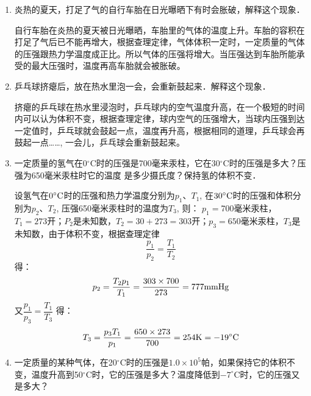 \begin{enumerate}
	\item 炎热的夏天，打足了气的自行车胎在日光曝晒下有时会胀破，解释这个现象．

\begin{solution}
  自行车胎在炎热的夏天被日光曝晒，车胎里的气体的温度上升。车胎的容积在打足了气后已不能再增大，根据查理定律，气体体积一定时，一定质量的气体的压强跟热力学温度成正比。所以气体的压强将增大。当压强达到车胎所能承受的最大压强时，温度再高车胎就会被胀破。
\end{solution}
\item 乒乓球挤瘪后，放在热水里泡一会，会重新鼓起来．解释这个现象．

\begin{solution}
    挤瘪的乒乓球在热水里浸泡时，乒乓球内的空气温度升高，在一个极短的时间内可以认为体积不变，根据查理定律，球内空气的压强增大，当球内压强到达一定值时，乒乓球就会鼓起一点，温度再升高，根据相同的道理，乒乓球会再鼓起一点……, 一会儿，乒乓球会重新鼓起来。
\end{solution}
\item 一定质量的氢气在0$^\circ$C时的压强是700毫来汞柱，它在30$^\circ$C时的压强是多大？压强为650毫米汞柱时它的温度
是多少摄氏度？保持氢的体积不变．

\begin{solution}
设氢气在$0^{\circ}{\rm C}$时的压强和热力学温度分别为$p_1$、$T_1$, 在$30^{\circ}{\rm C}$时的压强和体积分别为$p_2$、$T_2$, 压强650毫米汞柱时的温度为$T_3$, 则：
$p_1=$700毫米汞柱，$T_1=273$开；$P_2$是未知数，$T_2=30+273=303$开；$p_3=650$毫米汞柱，$T_3$是未知数，由于体积不变，根据查理定律
\[\frac{p_1}{p_2}=\frac{T_1}{T_2}\]
得：
\[p_2=\frac{T_2p_1}{T_1}=\frac{303\times 700}{273}=777{\rm mmHg}\]
又$\dfrac{p_1}{p_3}=\dfrac{T_1}{T_3}$
得：
\[T_3=\frac{p_3T_1}{p_1}=\frac{650\times 273}{700}=254{\rm K}=-19^{\circ}{\rm C}\]
\end{solution}
\item 一定质量的某种气体，在20$^\circ$C时的压强是$1.0\times 10^5$帕，如果保持它的体积不变，温度升高到50$^\circ$C时，它的压强是多大？温度降低到$-7^\circ$C时，它的压强又是多大？


\end{enumerate}
